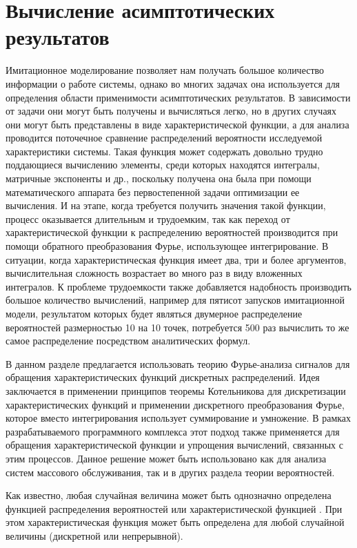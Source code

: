 \section {Вычисление асимптотических результатов}
Имитационное моделирование позволяет нам получать большое количество информации о работе системы, однако во многих задачах она используется для определения области применимости асимптотических результатов. В зависимости от задачи они могут быть получены и вычисляться легко, но в других случаях они могут быть представлены в виде характеристической функции, а для анализа проводится поточечное сравнение распределений вероятности исследуемой характеристики системы. Такая функция может содержать довольно трудно поддающиеся вычислению элементы, среди которых находятся интегралы, матричные экспоненты и др., поскольку получена она была при помощи математического аппарата без первостепенной задачи оптимизации ее вычисления. И на этапе, когда требуется получить значения такой функции, процесс оказывается длительным и трудоемким, так как переход от характеристической функции к распределению вероятностей производится при помощи обратного преобразования Фурье, использующее интегрирование. В ситуации, когда характеристическая функция имеет два, три и более аргументов, вычислительная сложность возрастает во много раз в виду вложенных интегралов. К проблеме трудоемкости также добавляется надобность производить большое количество вычислений, например для пятисот запусков имитационной модели, результатом которых будет являться двумерное распределение вероятностей размерностью 10 на 10 точек, потребуется 500 раз вычислить то же самое распределение посредством аналитических формул.

В данном разделе предлагается использовать теорию Фурье-анализа сигналов для обращения характеристических функций дискретных распределений. Идея заключается в применении принципов теоремы Котельникова \cite{ястребов2012дискретизация,kuznecov2008} для дискретизации характеристических функций и применении дискретного преобразования Фурье, которое вместо интегрирования использует суммирование и умножение. В рамках разрабатываемого программного комплекса этот подход также применяется для обращения характеристической функции и упрощения вычислений, связанных с этим процессов. Данное решение может быть использовано как для анализа систем массового обслуживания, так и в других раздела теории вероятностей. 

Как известно, любая случайная величина может быть однозначно определена функцией распределения вероятностей или характеристической функцией \cite{gnedenko2010}. При этом характеристическая функция может быть определена для любой случайной величины (дискретной или непрерывной).

